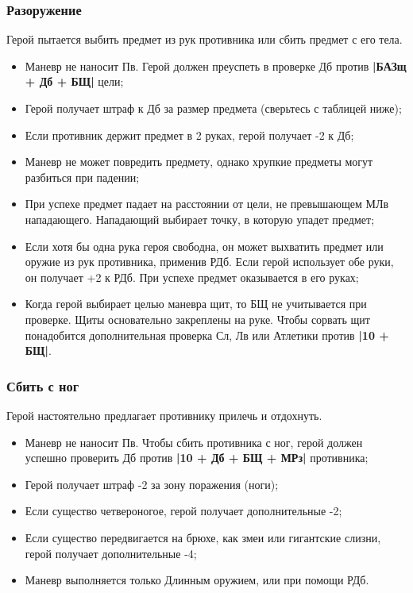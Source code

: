 \subsubsection{Разоружение}
Герой пытается выбить предмет из рук противника или сбить предмет с его тела.
\begin{itemize}
  \item Маневр не наносит Пв. Герой должен преуспеть в проверке Дб против \textbf{|БАЗщ + Дб + БЩ|} цели;
  \item Герой получает штраф к Дб за размер предмета (сверьтесь с таблицей ниже);
  \item Если противник держит предмет в 2 руках, герой получает -2 к Дб;
  \item Маневр не может повредить предмету, однако хрупкие предметы могут разбиться при падении;
  \item При успехе предмет падает на расстоянии от цели, не превышающем МЛв нападающего. Нападающий выбирает точку, в которую упадет предмет;
  \item Если хотя бы одна рука героя свободна, он может выхватить предмет или оружие из рук противника, применив РДб. Если герой использует обе руки, он получает +2 к РДб. При успехе предмет оказывается в его руках;
  \item Когда герой выбирает целью маневра щит, то БЩ не учитывается при проверке. Щиты основательно закреплены на руке. Чтобы сорвать щит понадобится дополнительная проверка Сл, Лв или Атлетики против \textbf{|10 + БЩ|}.
\end{itemize}

\subsubsection{Сбить с ног}
Герой настоятельно предлагает противнику прилечь и отдохнуть.
\begin{itemize}
  \item Маневр не наносит Пв. Чтобы сбить противника с ног, герой должен успешно проверить Дб против \textbf{|10 + Дб + БЩ + МРз|} противника;
  \item Герой получает штраф -2 за зону поражения (ноги);
  \item Если существо четвероногое, герой получает дополнительные -2;
  \item Если существо передвигается на брюхе, как змеи или гигантские слизни, герой получает дополнительные -4;
  \item Маневр выполняется только Длинным оружием, или при помощи РДб.
\end{itemize}

